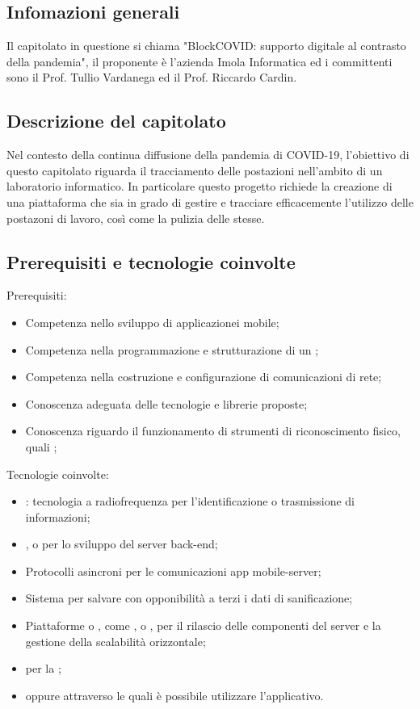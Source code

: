 
\subsection{Infomazioni generali}
Il capitolato in questione si chiama "BlockCOVID: supporto digitale al contrasto della pandemia", il proponente è l'azienda Imola Informatica ed i committenti sono il Prof. Tullio Vardanega ed il Prof. Riccardo Cardin.

\subsection{Descrizione del capitolato}
Nel contesto della continua diffusione della pandemia di COVID-19, l'obiettivo di questo capitolato riguarda il tracciamento delle postazioni nell'ambito di un laboratorio informatico. In particolare questo progetto richiede la creazione di una piattaforma che sia in grado di gestire e tracciare efficacemente l'utilizzo delle postazoni di lavoro, così come la pulizia delle stesse.

\subsection{Prerequisiti e tecnologie coinvolte}
Prerequisiti:
\begin{itemize}
\item Competenza nello sviluppo di applicazionei mobile;
\item Competenza nella programmazione e strutturazione di un ;
\item Competenza nella costruzione e configurazione di comunicazioni di rete;
\item Conoscenza adeguata delle tecnologie e librerie proposte;
\item Conoscenza riguardo il funzionamento di strumenti di riconoscimento fisico, quali ;
\end{itemize}

Tecnologie coinvolte:
\begin{itemize}
\item {}: tecnologia a radiofrequenza per l'identificazione o trasmissione di informazioni;
\item {},  o  per lo sviluppo del server back-end;
\item Protocolli asincroni per le comunicazioni app mobile-server;
\item Sistema  per salvare con opponibilità a terzi i dati di sanificazione;
\item Piattaforme  o , come ,  o , per il rilascio delle componenti del server e la gestione della scalabilità orizzontale;
\item {} per la ;
\item {} oppure  attraverso le quali è possibile utilizzare l'applicativo.
\end{itemize}

